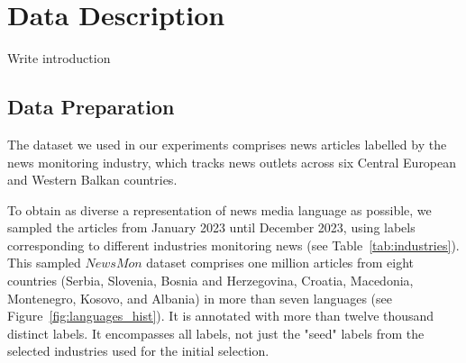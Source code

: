 % 
\chapter{Data Description}
\label{ch:data}
Write introduction

\section{Data Preparation}

The dataset we used in our experiments comprises news articles labelled by the news monitoring industry, which tracks news outlets across six Central European and Western Balkan countries.

\begin{table}[h!]
\centering
\caption{List of Selected Industries}
\label{tab:industries}
\centering
\end{table}

To obtain as diverse a representation of news media language as possible, we sampled the articles from January 2023 until December 2023, using labels corresponding to different industries monitoring news (see Table~\ref{tab:industries}). 
This sampled $NewsMon$ dataset comprises one million articles from eight countries (Serbia, Slovenia, Bosnia and Herzegovina, Croatia, Macedonia, Montenegro, Kosovo, and Albania) in more than seven languages (see Figure~\ref{fig:languages_hist}).
It is annotated with more than twelve thousand distinct labels. 
It encompasses all labels, not just the "seed" labels from the selected industries used for the initial selection.

